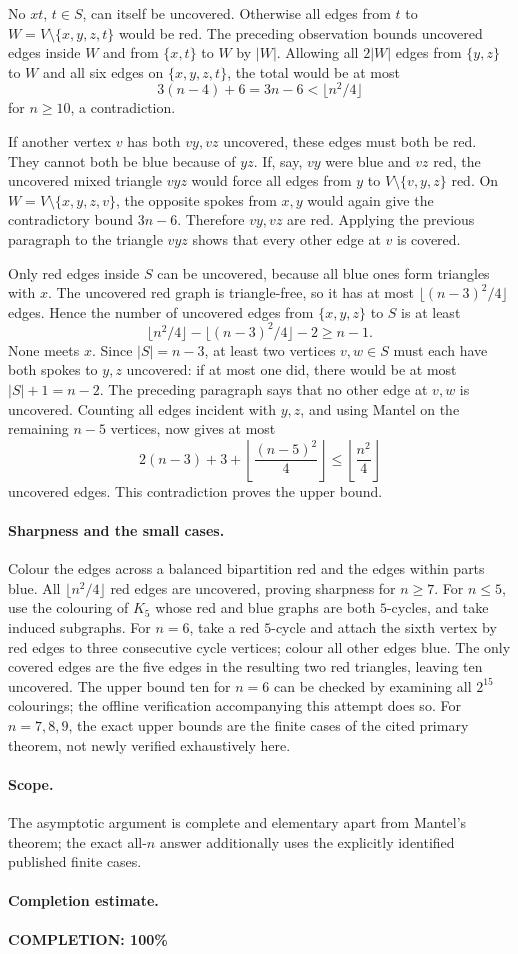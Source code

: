 No \(xt\), \(t\in S\), can itself be uncovered.
Otherwise all edges from \(t\) to
\(W=V\setminus\{x,y,z,t\}\) would be red.
The preceding observation bounds uncovered edges inside \(W\)
and from \(\{x,t\}\) to \(W\) by \(|W|\).
Allowing all \(2|W|\) edges from \(\{y,z\}\) to \(W\) and all
six edges on \(\{x,y,z,t\}\), the total would be at most
\[
 3(n-4)+6=3n-6<\lfloor n^2/4\rfloor
\]
for \(n\geq10\), a contradiction.

If another vertex \(v\) has both \(vy,vz\) uncovered, these edges
must both be red. They cannot both be blue because of \(yz\).
If, say, \(vy\) were blue and \(vz\) red, the uncovered mixed
triangle \(vyz\) would force all edges from \(y\) to
\(V\setminus\{v,y,z\}\) red. On
\(W=V\setminus\{x,y,z,v\}\), the opposite spokes from \(x,y\)
would again give the contradictory bound \(3n-6\).
Therefore \(vy,vz\) are red. Applying the previous paragraph to
the triangle \(vyz\) shows that every other edge at \(v\) is covered.

Only red edges inside \(S\) can be uncovered, because all blue
ones form triangles with \(x\). The uncovered red graph is
triangle-free, so it has at most \(\lfloor(n-3)^2/4\rfloor\)
edges. Hence the number of uncovered edges from \(\{x,y,z\}\)
to \(S\) is at least
\[
 \lfloor n^2/4\rfloor-\lfloor(n-3)^2/4\rfloor-2\geq n-1.
\]
None meets \(x\). Since \(|S|=n-3\), at least two vertices
\(v,w\in S\) must each have both spokes to \(y,z\) uncovered:
if at most one did, there would be at most \(|S|+1=n-2\).
The preceding paragraph says that no other edge at \(v,w\)
is uncovered. Counting all edges incident with \(y,z\), and
using Mantel on the remaining \(n-5\) vertices, now gives at most
\[
 2(n-3)+3+\left\lfloor\frac{(n-5)^2}{4}\right\rfloor
 \leq\left\lfloor\frac{n^2}{4}\right\rfloor
\]
uncovered edges. This contradiction proves the upper bound.

\paragraph{Sharpness and the small cases.}
Colour the edges across a balanced bipartition red and the edges
within parts blue. All \(\lfloor n^2/4\rfloor\) red edges are
uncovered, proving sharpness for \(n\geq7\).
For \(n\leq5\), use the colouring of \(K_5\) whose red and blue
graphs are both \(5\)-cycles, and take induced subgraphs.
For \(n=6\), take a red \(5\)-cycle and attach the sixth vertex
by red edges to three consecutive cycle vertices; colour all
other edges blue. The only covered edges are the five edges
in the resulting two red triangles, leaving ten uncovered.
The upper bound ten for \(n=6\) can be checked by examining
all \(2^{15}\) colourings; the offline verification accompanying
this attempt does so. For \(n=7,8,9\), the exact upper bounds
are the finite cases of the cited primary theorem, not newly
verified exhaustively here.

\paragraph{Scope.}
The asymptotic argument is complete and elementary apart from
Mantel's theorem; the exact all-\(n\) answer additionally uses
the explicitly identified published finite cases.

\paragraph{Completion estimate.}
\textbf{COMPLETION: 100\%}
